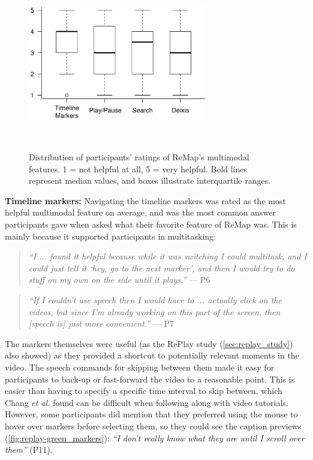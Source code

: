 \begin{figure}[t!]
\centering
  \includegraphics[width=0.7\textwidth]{remap/figures/boxplot.png}
  \caption{Distribution of participants' ratings of ReMap’s multimodal features. 1 = not helpful at all, 5 = very helpful. Bold lines represent median values, and boxes illustrate interquartile ranges. }~\label{fig:remap_boxplot}
\end{figure}

\textbf{Timeline markers:}
Navigating the timeline markers was rated as the most helpful multimodal feature on average, and was the most common answer participants gave when asked what their favorite feature of ReMap was. This is mainly because it supported participants in multitasking:

\begin{quote}
\textit{``I ... found it helpful because while it was switching I could multitask, and I could just tell it `hey, go to the next marker', and then I would try to do stuff on my own on the side until it plays.''} --- P6
\end{quote}

\begin{quote}
\textit{``If I couldn't use speech then I would have to ... actually click on the videos, but since I'm already working on this part of the screen, then [speech is] just more convenient.''} --- P7
\end{quote}

The markers themselves were useful (as the RePlay study (\autoref{sec:replay_study}) also showed) as they provided a shortcut to potentially relevant moments in the video. The speech commands for skipping between them made it easy for participants to back-up or fast-forward the video to a reasonable point. This is easier than having to specify a specific time interval to skip between, which Chang \textit{et al.} \cite{Chang2019} found can be difficult when following along with video tutorials. However, some participants did mention that they preferred using the mouse to hover over markers before selecting them, so they could see the caption previews (\autoref{fig:replay-green_markers}): \textit{``I don't really know what they are until I scroll over them''} (P11).

